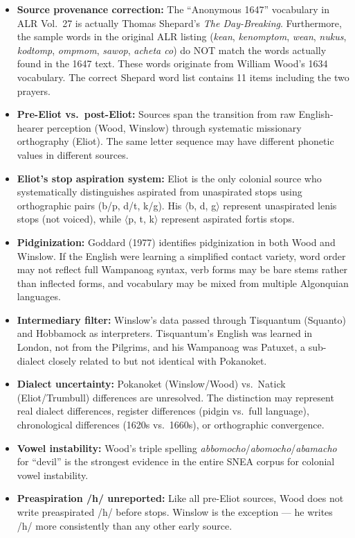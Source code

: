 \begin{itemize}
  \item \textbf{Source provenance correction:} The ``Anonymous 1647'' vocabulary
    in ALR Vol.\ 27 is actually Thomas Shepard's \emph{The Day-Breaking}.
    Furthermore, the sample words in the original ALR listing (\emph{kean},
    \emph{kenomptom}, \emph{wean}, \emph{nukus}, \emph{kodtomp}, \emph{ompmom},
    \emph{sawop}, \emph{acheta co}) do NOT match the words actually found in
    the 1647 text. These words originate from William Wood's 1634 vocabulary.
    The correct Shepard word list contains 11 items including the two prayers.
  \item \textbf{Pre-Eliot vs.\ post-Eliot:} Sources span the transition from
    raw English-hearer perception (Wood, Winslow) through systematic missionary
    orthography (Eliot). The same letter sequence may have different phonetic
    values in different sources.
  \item \textbf{Eliot's stop aspiration system:} Eliot is the only colonial
    source who systematically distinguishes aspirated from unaspirated stops
    using orthographic pairs (b/p, d/t, k/g). His $\langle$b, d, g$\rangle$
    represent unaspirated lenis stops (not voiced), while $\langle$p, t,
    k$\rangle$ represent aspirated fortis stops.
  \item \textbf{Pidginization:} Goddard (1977) identifies pidginization in both
    Wood and Winslow. If the English were learning a simplified contact variety,
    word order may not reflect full Wampanoag syntax, verb forms may be bare
    stems rather than inflected forms, and vocabulary may be mixed from multiple
    Algonquian languages.
  \item \textbf{Intermediary filter:} Winslow's data passed through Tisquantum
    (Squanto) and Hobbamock as interpreters. Tisquantum's English was learned
    in London, not from the Pilgrims, and his Wampanoag was Patuxet, a
    sub-dialect closely related to but not identical with Pokanoket.
  \item \textbf{Dialect uncertainty:} Pokanoket (Winslow/Wood) vs.\ Natick
    (Eliot/Trumbull) differences are unresolved. The distinction may represent
    real dialect differences, register differences (pidgin vs.\ full language),
    chronological differences (1620s vs.\ 1660s), or orthographic convergence.
  \item \textbf{Vowel instability:} Wood's triple spelling
    \emph{abbomocho}/\emph{abomocho}/\emph{abamacho} for ``devil'' is the
    strongest evidence in the entire SNEA corpus for colonial vowel instability.
  \item \textbf{Preaspiration /h/ unreported:} Like all pre-Eliot sources, Wood
    does not write preaspirated /h/ before stops. Winslow is the exception ---
    he writes /h/ more consistently than any other early source.
\end{itemize}

